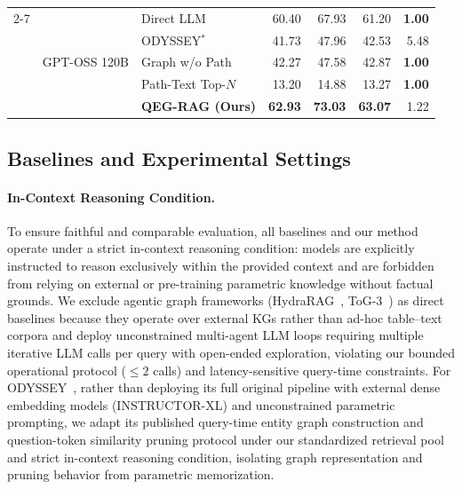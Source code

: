 \documentclass[runningheads]{llncs}
\begin{document}
\begin{table}[t]
{\begin{tabular}{@{}lllrrrr@{}}
\cmidrule{2-7}
& \multirow{5}{*}{GPT-OSS 120B} 
  & Direct LLM               & 60.40 & 67.93 & 61.20 & \textbf{1.00} \\
& & ODYSSEY$^*$~\cite{agarwal2025hybrid} & 41.73 & 47.96 & 42.53 & 5.48 \\
& & Graph w/o Path           & 42.27 & 47.58 & 42.87 & \textbf{1.00} \\
& & Path-Text Top-$N$        & 13.20 & 14.88 & 13.27 & \textbf{1.00} \\
& & \textbf{QEG-RAG (Ours)}  & \textbf{62.93} & \textbf{73.03} & \textbf{63.07} & 1.22 \\
\bottomrule
\end{tabular}%
}
\vspace{2.0mm}
\end{table}

\subsection{Baselines and Experimental Settings}
\paragraph{In-Context Reasoning Condition.}
To ensure faithful and comparable evaluation, all baselines and our method operate under a strict in-context reasoning condition: models are explicitly instructed to reason exclusively within the provided context and are forbidden from relying on external or pre-training parametric knowledge without factual grounds. We exclude agentic graph frameworks (HydraRAG~\cite{tan2025hydrarag}, ToG-3~\cite{wu2025tog3}) as direct baselines because they operate over external KGs rather than ad-hoc table--text corpora and deploy unconstrained multi-agent LLM loops requiring multiple iterative LLM calls per query with open-ended exploration, violating our bounded operational protocol ($\le 2$ calls) and latency-sensitive query-time constraints. For ODYSSEY~\cite{agarwal2025hybrid}, rather than deploying its full original pipeline with external dense embedding models (INSTRUCTOR-XL) and unconstrained parametric prompting, we adapt its published query-time entity graph construction and question-token similarity pruning protocol under our standardized retrieval pool and strict in-context reasoning condition, isolating graph representation and pruning behavior from parametric memorization.
\end{document}
